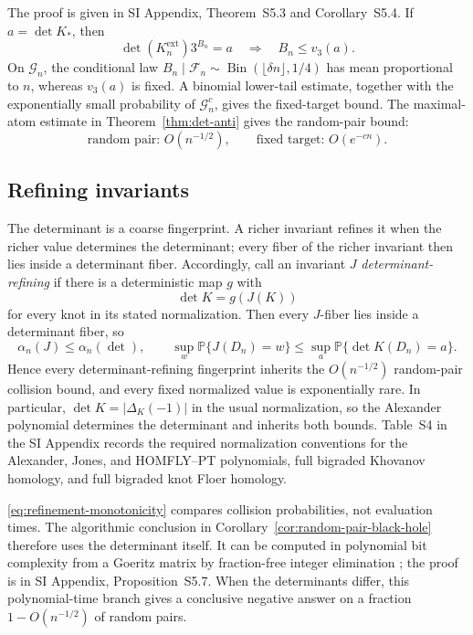 \documentclass[9pt,twoside]{pnas-new}
\theoremstyle{definition}
\theoremstyle{remark}
\renewcommand{\Pr}{\mathbb{P}}
\newcommand{\SILocation}[1]{SI Appendix, #1}
\newcommand{\SIFixedDeterminant}{Theorem~S5.3}
\newcommand{\SIFixedKnot}{Corollary~S5.4}
\newcommand{\SIDeterminantComplexity}{Proposition~S5.7}
\newcommand{\SIDeterminantRefinementTable}{Table~S4}
\begin{document}
The proof is given in \SILocation{\SIFixedDeterminant{} and \SIFixedKnot{}}.  If $a=\det K_*$, then
\[
 \det(K_n^{\mathrm{ext}})3^{B_n}=a
 \quad\Longrightarrow\quad
 B_n\le v_3(a).
\]
On $\mathcal G_n$, the conditional law $B_n\mid\mathcal F_n\sim\operatorname{Bin}(\lfloor\delta n\rfloor,1/4)$ has mean proportional to $n$, whereas $v_3(a)$ is fixed.  A binomial lower-tail estimate, together with the exponentially small probability of $\mathcal G_n^c$, gives the fixed-target bound.  The maximal-atom estimate in Theorem~\ref{thm:det-anti} gives the random-pair bound:
\[
 \text{random pair: }O(n^{-1/2}),
 \qquad
 \text{fixed target: }O(e^{-cn}).
\]

\subsection{Refining invariants}
The determinant is a coarse fingerprint.  A richer invariant refines it when the richer value determines the determinant; every fiber of the richer invariant then lies inside a determinant fiber.  Accordingly, call an invariant $J$ \emph{determinant-refining} if there is a deterministic map $g$ with
\[
 \det K=g(J(K))
\]
for every knot in its stated normalization.  Then every $J$-fiber lies inside a determinant fiber, so
\begin{equation}
 \alpha_n(J)\le\alpha_n(\det),
 \qquad
 \sup_w\Pr\{J(D_n)=w\}
 \le\sup_a\Pr\{\det K(D_n)=a\}.
 \label{eq:refinement-monotonicity}
\end{equation}
Hence every determinant-refining fingerprint inherits the $O(n^{-1/2})$ random-pair collision bound, and every fixed normalized value is exponentially rare.  In particular, $\det K=|\Delta_K(-1)|$ in the usual normalization, so the Alexander polynomial determines the determinant and inherits both bounds.  \SIDeterminantRefinementTable{} in the SI Appendix records the required normalization conventions for the Alexander, Jones, and HOMFLY--PT polynomials, full bigraded Khovanov homology, and full bigraded knot Floer homology.

\eqref{eq:refinement-monotonicity} compares collision probabilities, not evaluation times.  The algorithmic conclusion in Corollary~\ref{cor:random-pair-black-hole} therefore uses the determinant itself.  It can be computed in polynomial bit complexity from a Goeritz matrix by fraction-free integer elimination \cite{gordonlitherland1978,bareiss1968}; the proof is in \SILocation{\SIDeterminantComplexity{}}.  When the determinants differ, this polynomial-time branch gives a conclusive negative answer on a fraction $1-O(n^{-1/2})$ of random pairs.
\end{document}
